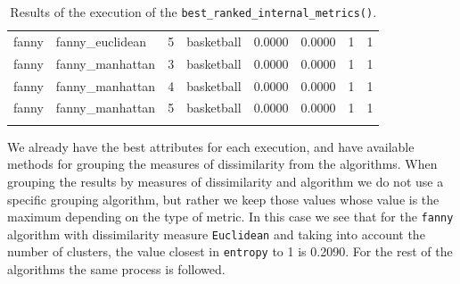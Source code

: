 \begin{itemize}
{\begin{longtable}{| p{1cm} | p{1.8cm} | p{0.9cm} | p{1.1cm} | p{1.6cm} | p{0.8cm} | p{1.3cm} | p{1.8cm} |}
\scriptsize   fanny    & \scriptsize fanny\_euclidean & \scriptsize    5     & \scriptsize basketball & \scriptsize    0.0000    & \scriptsize 0.0000 & \scriptsize    1     & \scriptsize        1 \\
\cline{2-8}
\scriptsize   fanny    & \scriptsize fanny\_manhattan & \scriptsize    3     & \scriptsize basketball & \scriptsize    0.0000    & \scriptsize 0.0000 & \scriptsize    1     & \scriptsize        1 \\
\scriptsize   fanny    & \scriptsize fanny\_manhattan & \scriptsize    4     & \scriptsize basketball & \scriptsize    0.0000    & \scriptsize 0.0000 & \scriptsize    1     & \scriptsize        1 \\
\scriptsize   fanny    & \scriptsize fanny\_manhattan & \scriptsize    5     & \scriptsize basketball & \scriptsize    0.0000    & \scriptsize 0.0000 & \scriptsize    1     & \scriptsize        1 \\
\hline
\caption{Results of the execution of the \texttt{best\_ranked\_internal\_metrics()}.}
\label{tab:clusteringbestrankedinternalmetrics}
\end{longtable}}

We already have the best attributes for each execution, and have available methods for grouping the measures of dissimilarity from the algorithms. When grouping the results by measures of dissimilarity and algorithm we do not use a specific grouping algorithm, but rather we keep those values whose value is the maximum depending on the type of metric. In this case we see that for the \texttt{fanny} algorithm with dissimilarity measure \texttt{Euclidean} and taking into account the number of clusters, the value closest in \texttt{entropy} to 1 is 0.2090. For the rest of the algorithms the same process is followed.


\end{itemize}
